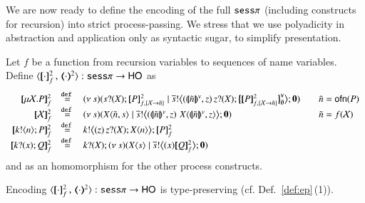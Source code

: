 We are now ready to define the encoding of the full $\mathtt{sess}\pi$ (including constructs for recursion)
into strict process-passing. We stress that we use polyadicity in abstraction and application only as syntactic sugar, to simplify presentation.

\begin{definition}
Let $f$ be a function from recursion variables to sequences of name variables.
	Define $\fencod{\cdot}{\cdot}{2}{f}: \sesp \to \HO$ as
\[
\begin{array}{rcll}
	\pmapp{\rec{X}{P}}{2}{f} &\defeq& \newsp{s}{\binp{s}{\X} \pmapp{P}{2}{{f,\{\rvar{X}\to \tilde{n}\}}} \Par \bbout{\dual{s}}{\abs{\vmap{\tilde{n}}, z } \,{\binp{z}{\X} \auxmapp{\pmapp{P}{2}{{f,\{\rvar{X}\to \tilde{n}\}}}}{\mathsf{v}}{\es}}} \inact} & \quad \tilde{n} = \ofn{P} \\ 
	\pmapp{\rvar{X}}{2}{f} &\defeq& \newsp{s}{\appl{\X}{\tilde{n}, s} \Par \bbout{\dual{s}}{ \abs{\vmap{\tilde{n}},z}\,\,{\appl{X}{ \vmap{\tilde{n}}, z}}} \inact} & \quad \tilde{n} = f(\rvar{X}) \\
			\pmapp{\bout{k}{n} P}{2}{f}	&\defeq&	\bbout{k}{ \abs{z}{\,\binp{z}{X} \appl{X}{n}} } \pmapp{P}{2}{f} \\
		\pmapp{\binp{k}{x} Q}{2}{f}	&\defeq&	\binp{k}{X} \newsp{s}{\appl{X}{s} \Par \bbout{\dual{s}}{\abs{x} \pmapp{Q}{2}{f}} \inact} 
\end{array}
\]
and as an homomorphism for the other process constructs. 
\end{definition}

\begin{proposition}
	Encoding $\fencod{\cdot}{\cdot}{2}{f}: \sesp \to \HO$  
	is type-preserving (cf. Def.~\ref{def:ep}\,(1)).
\end{proposition}


